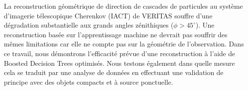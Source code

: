 \documentclass[main.tex]{subfiles}
\begin{document}
La reconstruction g\'eom\'etrique de direction de cascades de particules au système d'imagerie t\'elescopique Cherenkov (IACT) de VERITAS souffre d'une d\'egradation substantielle aux grands angles z\'enithiques ($ \phi> 45 ^{\circ} $). Une reconstruction bas\'ee sur l'apprentissage machine ne devrait pas souffrir des m\^emes limitations car elle ne compte pas sur la g\'eom\'etrie de l'observation. Dans ce travail, nous d\'emontrons l'efficacit\'e pr\'evue d'une reconstruction \`a l'aide de Boosted Decision Trees optimis\'es. Nous testons \'egalement dans quelle mesure cela se traduit par une analyse de donn\'ees en effectuant une validation de principe avec des objets compacts et \`a source ponctuelle.
\end{document}
